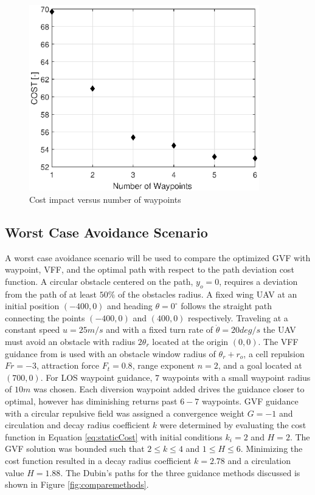 \documentclass[numbered,pdftex]{ohio-etd}
\begin{document}
\begin{figure}[H]
	\centering
	\includegraphics[width=10cm]{Figures/Waypoints/costVnumWpts}
	\caption{Cost impact versus number of waypoints}
	\label{fig:numWaypoints}
\end{figure}



\subsection{Worst Case Avoidance Scenario}
A worst case avoidance scenario will be used to compare the optimized GVF with waypoint, VFF, and the optimal path with respect to the path deviation cost function. A circular obstacle centered on the path, $y_o = 0$, requires a deviation from the path of at least $50\% $ of the obstacles radius. A fixed wing UAV at an initial position $(-400,0)$ and heading $\theta=0^\circ$ follows the straight path connecting the points $(-400,0)$ and $(400,0)$ respectively. Traveling at a constant speed $u=25 m/s$ and with a fixed turn rate of $\dot{\theta}=20 deg/s$ the UAV must avoid an obstacle with radius $2\theta_r$ located at the origin $(0,0)$. The VFF guidance from \cite{borenstein_real-time_1990} is used with an obstacle window radius of $\theta_r+r_o$, a cell repulsion $Fr=-3$, attraction force $F_t=0.8$, range exponent $n=2$, and a goal located at $(700,0)$. For LOS waypoint guidance, $7$ waypoints with a small waypoint radius of $10m$ was chosen. Each diversion waypoint added drives the guidance closer to optimal, however has diminishing returns past $6-7$ waypoints. GVF guidance with a circular repulsive field was assigned a convergence weight $G=-1$ and circulation and decay radius coefficient $k$ were determined by evaluating the cost function in Equation \ref{eq:staticCost} with initial conditions $k_i = 2$ and $H=2$. The GVF solution was bounded such that $2\leq k\leq 4$ and $1\leq H\leq 6$.  Minimizing the cost function resulted in a decay radius coefficient $k=2.78$ and a circulation value $H=1.88$. The Dubin's paths for the three guidance methods discussed is shown in Figure \ref{fig:comparemethods}. \\
\end{document}
